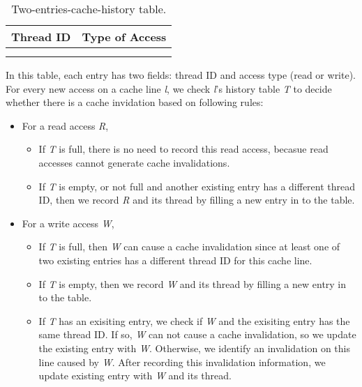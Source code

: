 \begin{table}
\centering
  \begin{tabular}{ l | r }
    \hline
    {Thread ID} & {Type of Access} \\ \hline
    \hline
     &   \\ \hline
     &   \\ \hline
  \end{tabular}
  \caption{Two-entries-cache-history table. \label{table:cachehistory}}
\end{table} 

In this table, each entry has two fields: thread ID and access type (read or write). 
For every new access on a cache line {\it l}, we check {\it l}'s history table
{\it T} to decide whether there is a cache invidation based on following rules:

\begin{itemize}
\item
  For a read access {\it R}, 
  \begin{itemize}
    \item
      If {\it T} is full, there is no need to record this read access, becasue
      read accesses cannot generate cache invalidations.
    \item
      If {\it T} is empty, or not full and another existing entry has a different thread
      ID, then we record {\it R} and its thread by filling a new entry in to the table. 
  \end{itemize}
\item
  For a write access {\it W}, 
  \begin{itemize}
    \item
      If {\it T} is full, then {\it W} can cause a cache invalidation since at least 
      one of two existing entries has a different thread ID for this cache line. 
    \item
      If {\it T} is empty,
      then we record {\it W} and its thread by filling a new entry in to the table. 
    \item
      If {\it T} has an exisiting entry,
      we check if {\it W} and the exisiting entry has the same thread ID. If
      so, {\it W} can not cause a cache invalidation, so we update the existing
      entry with {\it W}. Otherwise, we identify an invalidation on this line caused by
      {\it W}. After recording this invalidation information, we update 
      existing entry with {\it W} and its thread.
  \end{itemize}
\end{itemize}

